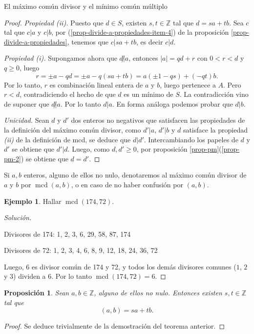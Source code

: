 \documentclass[11pt,spanish,makeidx]{amsbook}
\newtheorem{proposicion}[teorema]{Proposici\'on}
\theoremstyle{definition}
\newtheorem{ejemplo}{Ejemplo}[section]
\theoremstyle{remark}
\newcommand \ZZ{{\mathbb Z}}
\newcommand \mcd{\operatorname{mcd}}
\begin{document}
\begin{section}{El máximo común divisor y el mínimo común múltiplo}
\begin{proof}
	\textit{Propiedad {(ii)}.} Puesto  que $d \in S$,  existen $s, t \in \ZZ$ tal que $d = sa+tb$. Sea $c$ tal que $c|a$ y $c|b$, por (\ref{prop-divide-a-propiedades-item-4}) de la proposición \ref{prop-divide-a-propiedades},  tenemos que $c|sa+tb$,  es decir $c|d$. 
	
	\textit{Propiedad {(i)}.} Supongamos ahora que $d {\not|} a$,  entonces $|a| = qd + r$ con $0 < r <d$ y $q \ge 0$, luego $$r = \pm a - qd = \pm a-q(sa+tb) = a(\pm1-qs) +(-qt)b.$$ Por lo tanto, $r$ es combinación lineal entera de $a$ y $b$, luego  pertenece a $A$.  Pero $r < d$, contradiciendo  el hecho de que $d$  es un mínimo de $S$. La contradicción vino de suponer que  $d{\not|}  a$. Por lo tanto $d|a$. En  forma análoga podemos probar que $d|b$. 
	
	
	\textit{Unicidad.} Sean $d$ y $d'$ dos enteros no negativos que satisfacen las propiedades de la definición del máximo común divisor, como $d'|a$, $d'|b$ y  $d$ satisface la propiedad \textit{(ii)} de la definición de mcd, se deduce que $d|d'$. Intercambiando  los papeles de $d$ y $d'$ se obtiene que $d'|d$. Luego, como $d,d'\ge 0$, por  proposición \ref{prop-pm}(\ref{prop-pm-2}) se obtiene que $d=d'$.
\end{proof}

Si $a,b$ enteros,  alguno de ellos  no nulo,  denotaremos al máximo común divisor  de $a$ y $b$ por $\mcd(a,b)$, o en caso de no haber confusión por $(a,b)$.


\begin{ejemplo} Hallar   $\mcd(174,72)$.
	\begin{proof}[Solución] ${^{}}$
		
		Divisores de 174: 1, 2, 3, 6, 29, 58, 87, 174
		
		Divisores de 72: 1, 2, 3, 4, 6, 8, 9, 12, 18, 24, 36, 72 
		
		Luego, $6$ es divisor común de 174 y 72, y todos los demás divisores comunes ($1$, $2$ y $3$) dividen a $6$. Por lo tanto $\mcd(174,72) =6$.
	\end{proof}


\begin{proposicion}\label{prop-d-comb-lin}
	Sean $a,b \in \ZZ$, alguno de ellos no nulo. Entonces existen $s,t \in \ZZ$ tal que
	\begin{equation*}
		(a,b) = sa + tb. 
	\end{equation*}
\end{proposicion}
\begin{proof}
	Se deduce trivialmente de la demostración del teorema anterior. 
\end{proof}


\end{ejemplo}
\end{section}
\end{document}
